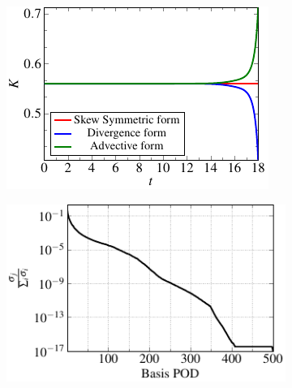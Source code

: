 \begin{figure}[t]
  \centering
  \begin{subfigure}[]{0.47\linewidth}
            \includegraphics[scale=1]{Figures/paper-figure0.pdf}
\caption{}
\label{compare_different_models}
\end{subfigure}
  \begin{subfigure}[]{0.47\linewidth}
            \includegraphics[scale=1]{Figures/paper-figure1.pdf}

\end{subfigure}
\end{figure}
